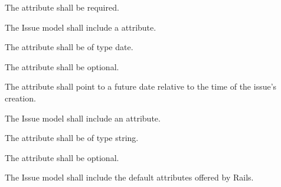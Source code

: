 \documentclass[12pt]{report}
\begin{document}
\begin{reqlist}
\begin{reqlist}
\begin{reqlist}
					\item The attribute shall be required.
				\end{reqlist}
				\item The Issue model shall include a  attribute.
				\begin{reqlist}
					\item The attribute shall be of type date.
					\item The attribute shall be optional.
					\item The attribute shall point to a future date relative to the time of the issue's creation.
				\end{reqlist}
				\item The Issue model shall include an  attribute.
				\begin{reqlist}
					\item The attribute shall be of type string.
					\item The attribute shall be optional.
				\end{reqlist}
				\item The Issue model shall include the default  attributes offered by Rails.
			\end{reqlist}
		\end{reqlist}
\end{document}
